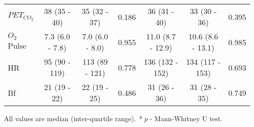 \begin{sidewaystable}[p]
\begin{tabular}{l | c c c | c c c}
		$PET_{CO_2}$                 & 38 (35 - 40)       & 35 (32 - 37)       & 0.186 & 36 (31 - 40)       & 33 (30 - 36)       & 0.395 \\
		$O_2$Pulse                   & 7.3 (6.0 - 7.8)    & 7.0 (6.0 - 8.0)    & 0.955 & 11.0 (8.7 - 12.9)  & 10.6 (8.6 - 13.1)  & 0.985 \\
		HR                           & 95 (90 - 119)      & 113 (89 - 121)     & 0.778 & 136 (132 - 152)    & 134 (117 - 153)    & 0.693 \\
		Bf                           & 21 (19 - 22)       & 22 (19 - 25)       & 0.486 & 31 (26 - 36)       & 31 (28 - 35)       & 0.749 \\ \hline
	\end{tabular}
	
	All values are median (inter-quartile range). \textit{* p} - Mann-Whitney U test.
\end{sidewaystable}

